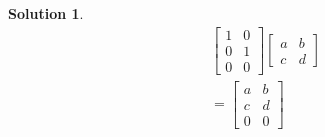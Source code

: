 \documentclass{article}
\newtheorem*{solution}{Solution}
\begin{document}
\begin{solution}
\begin{align*}
& \begin{bmatrix}
1 & 0 \\ 0 & 1 \\ 0 & 0 
\end{bmatrix}
\begin{bmatrix}
a & b \\ c & d
\end{bmatrix} \\
&= \begin{bmatrix}
a & b \\ c & d \\ 0 & 0 
\end{bmatrix}
\end{align*}
\end{solution}
\end{document}
